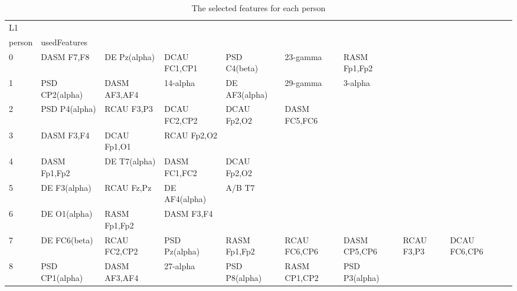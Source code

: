 \begin{landscape}
\begin{table}[]
\centering
\caption{The selected features for each person}
\begin{tabular}{l|llllllll}
L1       &                &                &                &                &                &                &               &                &               &               \\
person   & usedFeatures   &                &                &                &                &                &               &                &               &               \\
0        & DASM F7,F8     & DE Pz(alpha)   & DCAU FC1,CP1   & PSD C4(beta)   & 23-gamma       & RASM Fp1,Fp2   &               &                &               &               \\
1        & PSD CP2(alpha) & DASM AF3,AF4   & 14-alpha       & DE AF3(alpha)  & 29-gamma       & 3-alpha        &               &                &               &               \\
2        & PSD P4(alpha)  & RCAU F3,P3     & DCAU FC2,CP2   & DCAU Fp2,O2    & DASM FC5,FC6   &                &               &                &               &               \\
3        & DASM F3,F4     & DCAU Fp1,O1    & RCAU Fp2,O2    &                &                &                &               &                &               &               \\
4        & DASM Fp1,Fp2   & DE T7(alpha)   & DASM FC1,FC2   & DCAU Fp2,O2    &                &                &               &                &               &               \\
5        & DE F3(alpha)   & RCAU Fz,Pz     & DE AF4(alpha)  & A/B T7         &                &                &               &                &               &               \\
6        & DE O1(alpha)   & RASM Fp1,Fp2   & DASM F3,F4     &                &                &                &               &                &               &               \\
7        & DE FC6(beta)   & RCAU FC2,CP2   & PSD Pz(alpha)  & RASM Fp1,Fp2   & RCAU FC6,CP6   & DASM CP5,CP6   & RCAU F3,P3    & DCAU FC6,CP6   &               &               \\
8        & PSD CP1(alpha) & DASM AF3,AF4   & 27-alpha       & PSD P8(alpha)  & RASM CP1,CP2   & PSD P3(alpha)  &               &                &               &               \\

\end{tabular}
\end{table}
\end{landscape}

